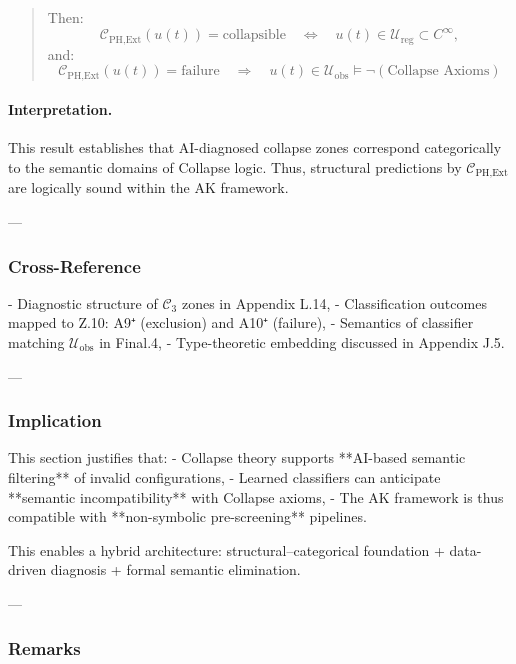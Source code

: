 \documentclass[11pt]{article}
\begin{document}
\begin{axiom}
\begin{axiom}
{{\begin{quote}
Then:
\[
\mathcal{C}_{\text{PH,Ext}}(u(t)) = \text{collapsible} \quad \Leftrightarrow \quad u(t) \in \mathcal{U}_{\text{reg}} \subset C^\infty,
\]
and:
\[
\mathcal{C}_{\text{PH,Ext}}(u(t)) = \text{failure} \quad \Rightarrow \quad u(t) \in \mathcal{U}_{\text{obs}} \models \neg(\text{Collapse Axioms})
\]
\end{quote}

\paragraph{Interpretation.}
This result establishes that AI-diagnosed collapse zones  
correspond categorically to the semantic domains of Collapse logic.  
Thus, structural predictions by \( \mathcal{C}_{\text{PH,Ext}} \)  
are logically sound within the AK framework.

---

\subsubsection*{Cross-Reference}

- Diagnostic structure of \(\mathcal{C}_3\) zones in Appendix L.14,  
- Classification outcomes mapped to Z.10: A9⁺ (exclusion) and A10⁺ (failure),  
- Semantics of classifier matching \(\mathcal{U}_{\text{obs}}\) in Final.4,  
- Type-theoretic embedding discussed in Appendix J.5.

---

\subsubsection*{Implication}

This section justifies that:
- Collapse theory supports **AI-based semantic filtering** of invalid configurations,
- Learned classifiers can anticipate **semantic incompatibility** with Collapse axioms,
- The AK framework is thus compatible with **non-symbolic pre-screening** pipelines.

This enables a hybrid architecture:  
structural–categorical foundation + data-driven diagnosis + formal semantic elimination.


---

\subsubsection*{Remarks}

}}
\end{axiom}
\end{axiom}
\end{document}

